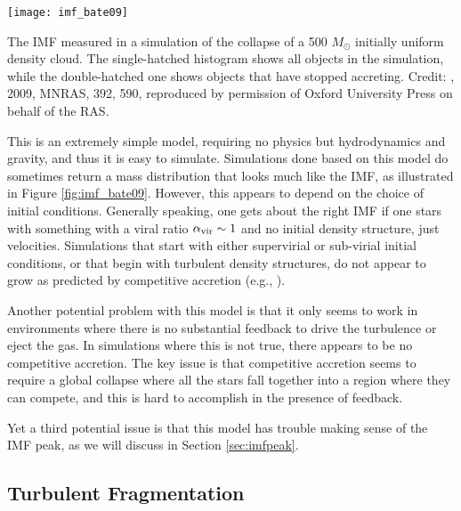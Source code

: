 \begin{marginfigure}
\texttt{[image: imf\_bate09]}
\caption[IMF in a competitive accretion simulation]{
\label{fig:imf_bate09}
The IMF measured in a simulation of the collapse of a 500 $M_\odot$ initially uniform density cloud. The single-hatched histogram shows all objects in the simulation, while the double-hatched one shows objects that have stopped accreting. Credit: \citeauthor{bate09b}, 2009, MNRAS, 392, 590, reproduced by permission of Oxford University Press on behalf of the RAS.
}
\end{marginfigure}
This is an extremely simple model, requiring no physics but hydrodynamics and gravity, and thus it is easy to simulate. Simulations done based on this model do sometimes return a mass distribution that looks much like the IMF, as illustrated in Figure \ref{fig:imf_bate09}. However, this appears to depend on the choice of initial conditions. Generally speaking, one gets about the right IMF if one stars with something with a viral ratio $\alpha_{\rm vir} \sim 1$ and no initial density structure, just velocities. Simulations that start with either supervirial or sub-virial initial conditions, or that begin with turbulent density structures, do not appear to grow as predicted by competitive accretion (e.g., \citealt{clark08a}).

Another potential problem with this model is that it only seems to work in environments where there is no substantial feedback to drive the turbulence or eject the gas. In simulations where this is not true, there appears to be no competitive accretion. The key issue is that competitive accretion seems to require a global collapse where all the stars fall together into a region where they can compete, and this is hard to accomplish in the presence of feedback.

Yet a third potential issue is that this model has trouble making sense of the IMF peak, as we will discuss in Section \ref{sec:imfpeak}.

\subsection{Turbulent Fragmentation}

